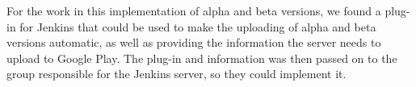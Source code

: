 For the work in this implementation of alpha and beta versions, we found a plug-in for Jenkins that could be used to make the uploading of alpha and beta versions automatic, as well as providing the information the server needs to upload to Google Play. The plug-in and information was then passed on to the group responsible for the Jenkins server, so they could implement it.